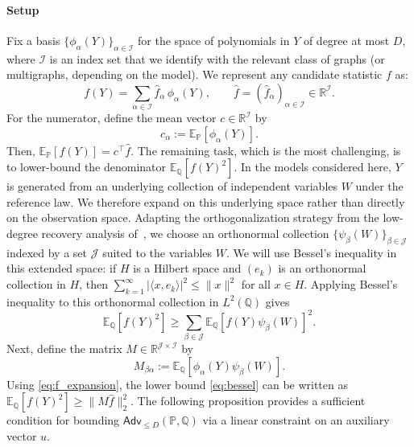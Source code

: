 \documentclass[11pt, letterpaper]{article}
\numberwithin{equation}{section}
\newcommand{\Adv}{\mathsf{Adv}}
\newcommand{\cJ}{\mathcal{J}}
\newcommand{\cI}{\mathcal{I}}
\newcommand{\E}{\mathbb{E}}
\newcommand{\PP}{\mathbb{P}}
\newcommand{\QQ}{\mathbb{Q}}
\newcommand{\R}{\mathbb{R}}
\begin{document}
\paragraph*{Setup} Fix a basis $\{\phi_\alpha(Y)\}_{\alpha\in\mathcal{I}}$ for the space of polynomials in $Y$ of degree at most $D$, where $\mathcal I$ is an index set that we identify with the relevant class of graphs (or multigraphs, depending on the model). We represent any candidate statistic $f$ as:
\begin{equation}\label{eq:f_expansion}
f(Y)=\sum_{\alpha\in\cI}\hat f_\alpha\,\phi_\alpha(Y),
\qquad \hat f=(\hat f_\alpha)_{\alpha\in\cI}\in\R^{\cI}.
\end{equation}
For the numerator, define the mean vector $c\in\R^{\cI}$ by
\begin{equation}\label{eq:c_def}
c_\alpha := \E_\PP[\phi_\alpha(Y)].
\end{equation}
Then, $\E_\PP[f(Y)]=c^\top \hat f$. The remaining task, which is the most challenging, is to lower-bound the denominator $\E_\QQ[f(Y)^2]$. In the models considered here, $Y$ is generated from an underlying collection of independent variables $W$ under the reference law. We therefore expand on this underlying space rather than directly on the observation space. Adapting the orthogonalization strategy from the low-degree recovery analysis of~\cite{sohn2025sharp}, we choose an orthonormal collection $\{\psi_\beta(W)\}_{\beta\in\mathcal J}$ indexed by a set $\mathcal J$ suited to the variables $W$. We will use Bessel's inequality in this extended space: if $H$ is a Hilbert space and $(e_k)$ is an orthonormal collection in $H$, then $\sum_{k=1}^{\infty} |\langle x, e_{k} \rangle|^{2} \le \|x\|^{2}$ for all $x \in H$. Applying Bessel's inequality to this orthonormal collection in $L^2(\QQ)$ gives
\begin{equation}\label{eq:bessel}
\E_\QQ[f(Y)^2] \ge \sum_{\beta\in\cJ}\E_\QQ[f(Y)\psi_\beta(W)]^2.
\end{equation}
Next, define the matrix $M\in\R^{\cJ\times\cI}$ by
\begin{equation}\label{eq:M_def}
M_{\beta\alpha}:=\E_\QQ[\phi_\alpha(Y)\psi_\beta(W)].
\end{equation}
Using \eqref{eq:f_expansion}, the lower bound \eqref{eq:bessel} can be written as
$\E_\QQ[f(Y)^2]\ge \|M\hat f\|_2^2$. The following proposition provides a sufficient condition for bounding $\Adv_{\le D}(\PP,\QQ)$ via a linear constraint on an auxiliary vector $u$.
\end{document}
